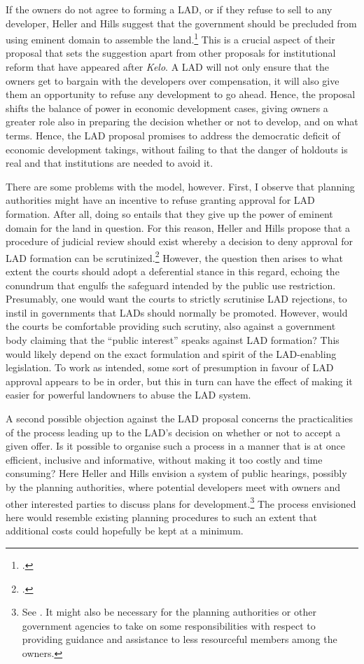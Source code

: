 If the owners do not agree to forming a LAD, or if they refuse to sell to any developer, Heller and Hills suggest that the government should be precluded from using eminent domain to assemble the land.\footcite[1491]{heller08} This is a crucial aspect of their proposal that sets the suggestion apart from other proposals for institutional reform that have appeared after {\it Kelo}. A LAD will not only ensure that the owners get to bargain with the developers over compensation, it will also give them an opportunity to refuse any development to go ahead. Hence, the proposal shifts the balance of power in economic development cases, giving owners a greater role also in preparing the decision whether or not to develop, and on what terms. Hence, the LAD proposal promises to address the democratic deficit of economic development takings, without failing to  that the danger of holdouts is real and that institutions are needed to avoid it.

There are some problems with the model, however. First, I observe that planning authorities might have an incentive to refuse granting approval for LAD formation. After all, doing so entails that they give up the power of eminent domain for the land in question. For this reason, Heller and Hills propose that a procedure of judicial review should exist whereby a decision to deny approval for LAD formation can be scrutinized.\footcite[1490]{heller08} However, the question then arises to what extent the courts should adopt a deferential stance in this regard, echoing the conundrum that engulfs the safeguard intended by the public use restriction. Presumably, one would want the courts to strictly scrutinise LAD rejections, to instil in governments that LADs should normally be promoted. However, would the courts be comfortable providing such scrutiny, also against a government body claiming that the ``public interest'' speaks against LAD formation? This would likely depend on the exact formulation and spirit of the LAD-enabling legislation. To work as intended, some sort of presumption in favour of LAD approval appears to be in order, but this in turn can have the effect of making it easier for powerful landowners to abuse the LAD system.

A second possible objection against the LAD proposal concerns the practicalities of the process leading up to the LAD's decision on whether or not to accept a given offer. Is it possible to organise such a process in a manner that is at once efficient, inclusive and informative, without making it too costly and time consuming? Here Heller and Hills envision a system of public hearings, possibly  by the planning authorities, where potential developers meet with owners and other interested parties to discuss plans for development.\footnote{See \cite[1490-1491]{heller08}. It might also be necessary for the planning authorities or other government agencies to take on some responsibilities with respect to providing guidance and assistance to less resourceful members among the owners.} The process envisioned here would resemble existing planning procedures to such an extent that additional costs could hopefully be kept at a minimum. 

